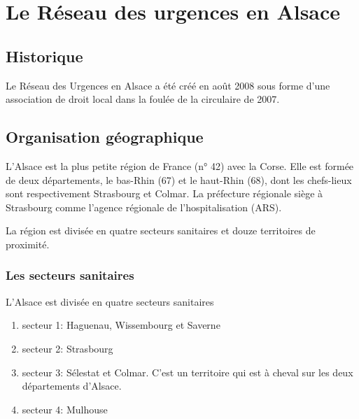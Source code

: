 \documentclass[12pt,english,french,twoside]{book}\usepackage[]{graphicx}\usepackage[]{color}
\begin{document}

\part{Le Réseau des urgences en Alsace}

\chapter{Historique}


Le Réseau des Urgences en Alsace a été créé en août 2008 sous forme d'une association de droit local dans la foulée de la circulaire de 2007.


\cite{16}


\newpage
\chapter{Organisation géographique}


L’Alsace est la plus petite région de France (n° 42) avec la Corse. Elle est formée de deux départements, le bas-Rhin (67) et le haut-Rhin (68), dont les chefs-lieux sont respectivement Strasbourg et Colmar. La préfecture régionale siège à Strasbourg comme l'agence régionale de l'hospitalisation  (ARS).

La région est divisée en quatre secteurs sanitaires et douze territoires de proximité.

\section{Les secteurs sanitaires}

L'Alsace est divisée en quatre secteurs sanitaires
\begin{enumerate}
  \item secteur 1: Haguenau, Wissembourg et Saverne
  \item secteur 2: Strasbourg
  \item secteur 3: Sélestat et Colmar. C'est un territoire qui est à cheval sur les deux départements d'Alsace.
  \item secteur 4: Mulhouse
\end{enumerate}
\end{document}
